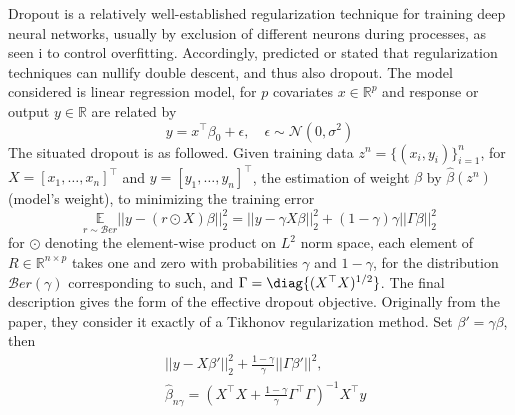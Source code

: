 \documentclass[
  journal=largetwo,
  year=2025,
  volume=37,
]{cup-journal}
\begin{document}
Dropout is a relatively well-established regularization technique for training deep neural networks, usually by exclusion of different neurons during processes, as seen i \cite{srivastava2014dropout} to control overfitting. Accordingly, \cite{Yang_2024} predicted or stated that regularization techniques can nullify double descent, and thus also dropout. The model considered is linear regression model, for $p$ covariates $x\in\mathbb{R}^{p}$ and response or output $y\in\mathbb{R}$ are related by \begin{equation}
    y = x^{\top}\beta_{0}+\epsilon , \quad \epsilon \sim \mathcal{N}(0,\sigma^{2})
\end{equation}
The situated dropout is as followed. Given training data $z^{n}=\{(x_{i},y_{i})\}^{n}_{i=1}$, for $X=[x_1,\dots,x_n]^{\top}$ and $y=[y_{1},\dots,y_{n}]^{\top}$, the estimation of weight $\beta$ by $\hat{\beta}(z^n)$ (model's weight), to minimizing the training error 
\begin{equation}
    \underset{r\sim\mathcal{B}er}{\mathbb{E}} || y - (r\odot X)\beta ||^{2}_{2} = ||y-\gamma X\beta||^{2}_{2} + (1-\gamma)\gamma ||\Gamma \beta ||_{2}^{2}
\end{equation}
for $\odot$ denoting the element-wise product on $L^{2}$ norm space, each element of $R\in\mathbb{R}^{n\times p}$ takes one and zero with probabilities $\gamma$ and $1-\gamma$, for the distribution $\mathcal{B}er(\gamma)$ corresponding to such, and $\Gamma = \diag{(X^{\top}X)^{1/2}}$. The final description gives the form of the effective dropout objective. Originally from the paper, they consider it exactly of a Tikhonov regularization method. Set $\beta'=\gamma \beta$, then \begin{equation}
    \begin{split}
        &||y-X\beta'||_{2}^{2} + \frac{1-\gamma}{\gamma} ||\Gamma \beta'||^2, \\
        &\hat{\beta}_{n\gamma} = \left(X^{\top}X+\frac{1-\gamma}{\gamma}\Gamma^{\top}\Gamma\right)^{-1}X^{\top}y
    \end{split}
\end{equation}
\end{document}
